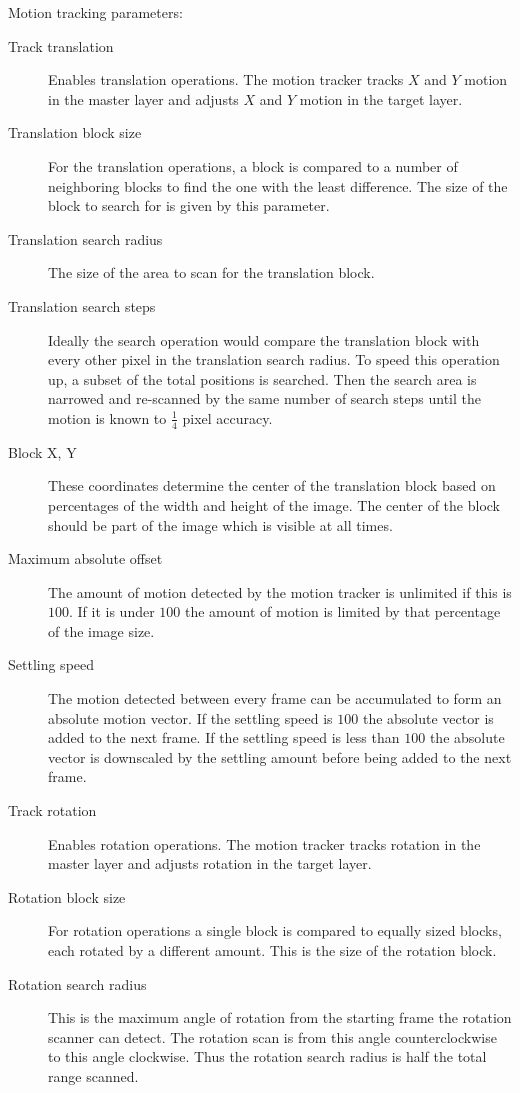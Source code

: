 Motion tracking parameters:

\begin{description}
    \item[Track translation] Enables translation operations. The motion tracker tracks $X$ and $Y$ motion in the master layer and adjusts $X$ and $Y$ motion in the target layer.
    
    \item[Translation block size] For the translation operations, a block is compared to a number of neighboring blocks to find the one with the least difference. The size of the block to search for is given by this parameter.
    \item[Translation search radius] The size of the area to scan for the translation block.
    \item[Translation search steps] Ideally the search operation would compare the translation block with every other pixel in the translation search radius. To speed this operation up, a subset of the total positions is searched. Then the search area is narrowed and re-scanned by the same number of search steps until the motion is known to $\frac{1}{4}$ pixel accuracy.
    \item[Block X, Y] These coordinates determine the center of the translation block based on percentages of the width and height of the image. The center of the block should be part of the image which is visible at all times.
    \item[Maximum absolute offset] The amount of motion detected by the motion tracker is unlimited if this is $100$. If it is under $100$ the amount of motion is limited by that percentage of the image size.
    \item[Settling speed] The motion detected between every frame can be accumulated to form an absolute motion vector. If the settling speed is $100$ the absolute vector is added to the next frame. If the settling speed is less than $100$ the absolute vector is downscaled by the settling amount before being added to the next frame.
    \item[Track rotation] Enables rotation operations. The motion tracker tracks rotation in the master layer and adjusts rotation in the target layer.
    \item[Rotation block size] For rotation operations a single block is compared to equally sized blocks, each rotated by a different amount. This is the size of the rotation block.
    \item[Rotation search radius] This is the maximum angle of rotation from the starting frame the rotation scanner can detect. The rotation scan is from this angle counterclockwise to this angle clockwise. Thus the rotation search radius is half the total range scanned.

\end{description}

